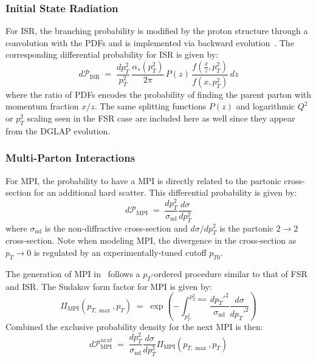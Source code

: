 \subsubsection{Initial State Radiation}
For ISR, the branching probability is modified by the proton structure through a convolution with the PDFs and is implemented via backward evolution~\cite{Buckley:2011event_generators_lhc}. 
The corresponding differential probability for ISR is given by:
\begin{equation}
d\mathcal{P}_{\text{ISR}} \;=\; \frac{d p_T^2}{p_T^2}\,\frac{\alpha_s(p_T^2)}{2\pi}\,P(z)\,\frac{f\!\left(\frac{x}{z}, p_T^2\right)}{f(x, p_T^2)}\,dz
\end{equation}
where the ratio of PDFs encodes the probability of finding the parent parton with momentum fraction $x/z$. 
The same splitting functions $P(z)$ and logarithmic $Q^2$ or $p_{T}^2$ scaling seen in the FSR case are included here as well since they appear from the DGLAP evolution.

\subsubsection{Multi-Parton Interactions}
For MPI, the probability to have a MPI is directly related to the partonic cross-section for an additional hard scatter. 
This differential probability is given by:
\begin{equation}
    d\mathcal{P}_{\text{MPI}} \;=\; \frac{dp^2_T}{\sigma_{\text{nd}}}\frac{d\sigma}{dp^2_T}
\end{equation}
where $\sigma_{\text{nd}}$ is the non-diffractive cross-section and $d\sigma/dp^2_T$ is the partonic $2\to 2$ cross-section. 
Note when modeling MPI, the divergence in the cross-section as $p_T \to 0$ is regulated by an experimentally-tuned cutoff $p_{T0}$.

The generation of MPI in \pythia\ follows a $p_{T}$-ordered procedure similar to that of FSR and ISR.
The Sudakov form factor for MPI is given by:
\begin{equation}
\Pi_{\text{MPI}}(p_{T,\max}, p_T) \;=\; \exp\!\left(-\int_{p_T^2}^{p_{T,\max}^2} \frac{dp_T'^2}{\sigma_{\text{nd}}}\frac{d\sigma}{dp_T'^2}\right)
\end{equation}
Combined the exclusive probability density for the next MPI is then:
\begin{equation}
d\mathcal{P}^{next}_{\text{MPI}} \;=\; \frac{dp^2_T}{\sigma_{\text{nd}}}\frac{d\sigma}{dp^2_T}\Pi_{\text{MPI}}(p_{T,\max}, p_T)
\end{equation}

